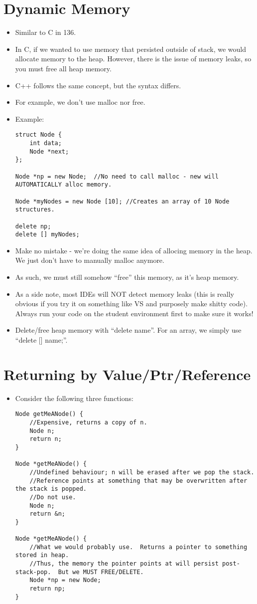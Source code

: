 \documentclass{article}
\begin{document}
\section{Dynamic Memory}
\begin{itemize}
\item Similar to C in 136.
\item In C, if we wanted to use memory that persisted outside of stack, we would allocate memory to the heap.  However, there is the issue of memory leaks, so you must free all heap memory.
\item C++ follows the same concept, but the syntax differs.
\item For example, we don't use malloc nor free.
\item Example:
\begin{lstlisting}
struct Node {
    int data;
    Node *next;
};

Node *np = new Node;  //No need to call malloc - new will AUTOMATICALLY alloc memory.

Node *myNodes = new Node [10]; //Creates an array of 10 Node structures.

delete np;
delete [] myNodes;
\end{lstlisting}
\item Make no mistake - we're doing the same idea of allocing memory in the heap.  We just don't have to manually malloc anymore.
\item As such, we must still somehow ``free'' this memory, as it's heap memory.
\item As a side note, most IDEs will NOT detect memory leaks (this is really obvious if you try it on something like VS and purposely make shitty code).  Always run your code on the student environment first to make sure it works!
\item Delete/free heap memory with ``delete name''.  For an array, we simply use ``delete [] name;''.
\end{itemize}

\section{Returning by Value/Ptr/Reference}
\begin{itemize}
\item Consider the following three functions:
\begin{lstlisting}
Node getMeANode() { 
    //Expensive, returns a copy of n.
    Node n;
    return n;
}

Node *getMeANode() { 
    //Undefined behaviour; n will be erased after we pop the stack.  
    //Reference points at something that may be overwritten after the stack is popped.
    //Do not use.
    Node n;
    return &n;
}

Node *getMeANode() { 
    //What we would probably use.  Returns a pointer to something stored in heap.
    //Thus, the memory the pointer points at will persist post-stack-pop.  But we MUST FREE/DELETE.
    Node *np = new Node;
    return np;
}
\end{lstlisting}
\end{itemize}
\end{document}
